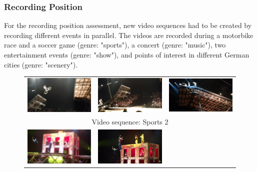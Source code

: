 \subsubsection{Recording Position}
For the recording position assessment, new video sequences had to be created by recording different events in parallel.
The videos are recorded during a motorbike race and a soccer game (genre: "sports"), a concert (genre: "music"), two entertainment events (genre: "show"), and points of interest in different German cities (genre: "scenery"). 
\begin{figure}[!htb]
	\begin{tabular}{ccc}
		\includegraphics[width=.33\textwidth]{./gfx/400_UGV_Quality/Video_Frames/Bike1} &
		\includegraphics[width=.325\textwidth]{./gfx/400_UGV_Quality/Video_Frames/Bike2} &
		\includegraphics[width=.335\textwidth]{./gfx/400_UGV_Quality/Video_Frames/Bike3}
		\\ 
		\multicolumn{3}{c}{Video sequence: Sports 2}\\
		\includegraphics[width=.315\textwidth]{./gfx/400_UGV_Quality/Video_Frames/jump1} &
		\includegraphics[width=.315\textwidth]{./gfx/400_UGV_Quality/Video_Frames/jump2} &

\end{tabular}
\end{figure}
